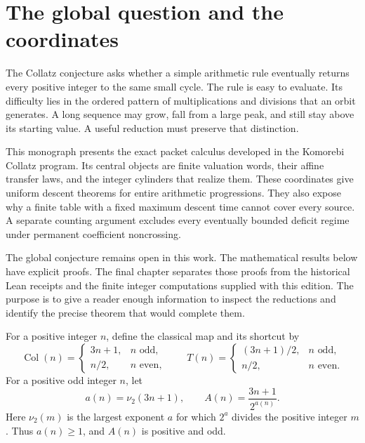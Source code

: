 \section{The global question and the coordinates}
The Collatz conjecture asks whether a simple arithmetic rule eventually returns every positive integer to the same small cycle. The rule is easy to evaluate. Its difficulty lies in the ordered pattern of multiplications and divisions that an orbit generates. A long sequence may grow, fall from a large peak, and still stay above its starting value. A useful reduction must preserve that distinction.

This monograph presents the exact packet calculus developed in the Komorebi Collatz program. Its central objects are finite valuation words, their affine transfer laws, and the integer cylinders that realize them. These coordinates give uniform descent theorems for entire arithmetic progressions. They also expose why a finite table with a fixed maximum descent time cannot cover every source. A separate counting argument excludes every eventually bounded deficit regime under permanent coefficient noncrossing.

The global conjecture remains open in this work. The mathematical results below have explicit proofs. The final chapter separates those proofs from the historical Lean receipts and the finite integer computations supplied with this edition. The purpose is to give a reader enough information to inspect the reductions and identify the precise theorem that would complete them.

\begin{definition}\label{def:maps}
For a positive integer $n$, define the classical map and its shortcut by
\begin{equation}\label{eq:classical}
\operatorname{Col}(n)=
\begin{cases}3n+1,&n\text{ odd},\\n/2,&n\text{ even},\end{cases}
\qquad
T(n)=
\begin{cases}(3n+1)/2,&n\text{ odd},\\n/2,&n\text{ even}.\end{cases}
\end{equation}
For a positive odd integer $n$, let
\begin{equation}\label{eq:oddmap}
a(n)=\nu_2(3n+1),\qquad A(n)=\frac{3n+1}{2^{a(n)}}.
\end{equation}
Here $\nu_2(m)$ is the largest exponent $a$ for which $2^a$ divides the positive integer $m$. Thus $a(n)\ge1$, and $A(n)$ is positive and odd.
\end{definition}

